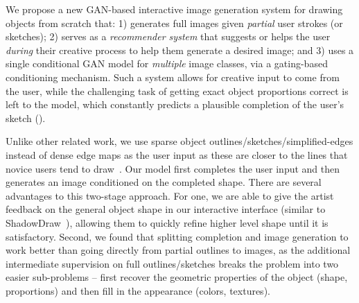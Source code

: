 We propose a new GAN-based interactive image generation system for drawing objects from scratch that: 1) generates full images given {\em partial} user strokes (or sketches); 2) serves as a \emph{recommender system} that suggests or helps the user \emph{during} their creative process to help them generate a desired image; and 3) uses a single conditional GAN model for {\em multiple} image classes, via a gating-based conditioning mechanism. Such a system allows for creative input to come from the user, while the challenging task of getting exact object proportions correct is left to the model, which constantly predicts a plausible completion of the user's sketch (). %



Unlike other related work, we use sparse object outlines/sketches/simplified-edges instead of dense edge maps as the user input
as these are closer to the lines that novice users tend to draw~\cite{cole2008people}. 
Our model first completes the user input and then generates an image conditioned on the completed shape. There are several advantages to this two-stage approach.
For one, we are able to give the artist feedback on the general object shape in our interactive interface (similar to ShadowDraw~\cite{lee2011shadowdraw}), allowing them to quickly refine higher level shape until it is satisfactory.
Second, we found that splitting completion and image generation to work better than going directly from partial outlines to images, as the additional intermediate supervision on full outlines/sketches breaks the problem into two easier sub-problems -- first recover the geometric properties of the object (shape, proportions) and then fill in the appearance (colors, textures). 



